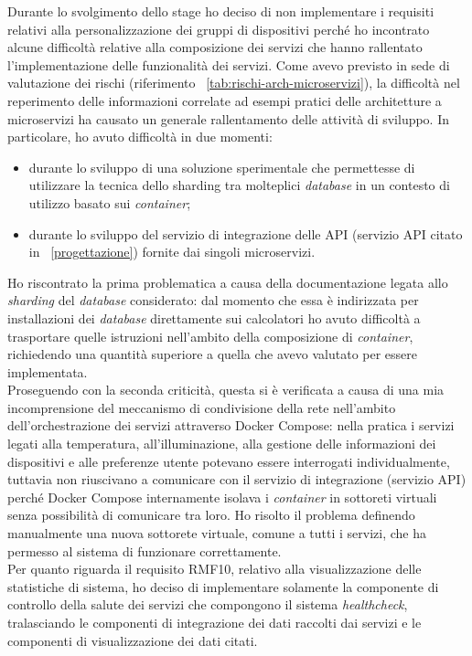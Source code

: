 Durante lo svolgimento dello stage ho deciso di non implementare i requisiti relativi alla personalizzazione dei gruppi di dispositivi perché ho incontrato alcune difficoltà relative alla composizione dei servizi che hanno rallentato l'implementazione delle funzionalità dei servizi. Come avevo previsto in sede di valutazione dei rischi (riferimento ~\ref{tab:rischi-arch-microservizi}), la difficoltà nel reperimento delle informazioni correlate ad esempi pratici delle architetture a microservizi ha causato un generale rallentamento delle attività di sviluppo.
In particolare, ho avuto difficoltà in due momenti:
\begin{itemize}[nosep]
  \item durante lo sviluppo di una soluzione sperimentale che permettesse di utilizzare la tecnica dello \gls{sharding} tra molteplici \emph{database} in un contesto di utilizzo basato sui \emph{container};
  \item durante lo sviluppo del servizio di integrazione delle API (servizio API citato in ~\ref{progettazione}) fornite dai singoli microservizi.
\end{itemize}
Ho riscontrato la prima problematica a causa della documentazione legata allo \emph{sharding} del \emph{database} considerato: dal momento che essa è indirizzata per installazioni dei \emph{database} direttamente sui calcolatori ho avuto difficoltà a trasportare quelle istruzioni nell'ambito della composizione di \emph{container}, richiedendo una quantità superiore a quella che avevo valutato per essere implementata.\\
Proseguendo con la seconda criticità, questa si è verificata a causa di una mia incomprensione del meccanismo di condivisione della rete nell'ambito dell'orchestrazione dei servizi attraverso Docker Compose: nella pratica i servizi legati alla temperatura, all'illuminazione, alla gestione delle informazioni dei dispositivi e alle preferenze utente potevano essere interrogati individualmente, tuttavia non riuscivano a comunicare con il servizio di integrazione (servizio API) perché Docker Compose internamente isolava i \emph{container} in sottoreti virtuali senza possibilità di comunicare tra loro. Ho risolto il problema definendo manualmente una nuova sottorete virtuale, comune a tutti i servizi, che ha permesso al sistema di funzionare correttamente.\\
Per quanto riguarda il requisito RMF10, relativo alla visualizzazione delle statistiche di sistema, ho deciso di implementare solamente la componente di controllo della salute dei servizi che compongono il sistema \emph{healthcheck}, tralasciando le componenti di integrazione dei dati raccolti dai servizi e le componenti di visualizzazione dei dati citati.\\
